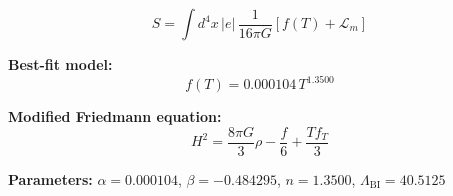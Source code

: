 
\begin{equation}
  S = \int d^4x \, |e| \, \frac{1}{16\pi G} \left[ f(T) + \mathcal{L}_m \right]
\end{equation}

\textbf{Best-fit model:}
\begin{equation}
  f(T) = 0.000104 \, T^{1.3500}
\end{equation}

\textbf{Modified Friedmann equation:}
\begin{equation}
  H^2 = \frac{8\pi G}{3} \rho - \frac{f}{6} + \frac{T f_T}{3}
\end{equation}

\textbf{Parameters:}
$\alpha = 0.000104$, \quad
$\beta = -0.484295$, \quad
$n = 1.3500$, \quad
$\Lambda_{\text{BI}} = 40.5125$
